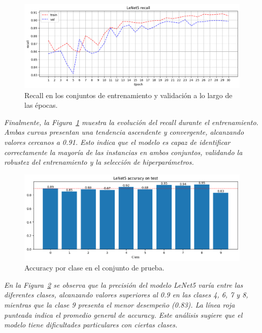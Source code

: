 \documentclass[conference]{IEEEtran}
\begin{document}
\begin{figure}[H]
    \centering
    \includegraphics[width=0.95\linewidth]{graphics-raw-da/raw-da-recall-train_val.png}
    \caption{Recall en los conjuntos de entrenamiento y validación a lo largo de las épocas.}
    \label{fig:raw-da-recall-train_val}
\end{figure}
\noindent\textit{
Finalmente, la Figura~\ref{fig:raw-da-recall-train_val} muestra la evolución del recall durante el entrenamiento. Ambas curvas presentan una tendencia ascendente y convergente, alcanzando valores cercanos a 0.91. Esto indica que el modelo es capaz de identificar correctamente la mayoría de las instancias en ambos conjuntos, validando la robustez del entrenamiento y la selección de hiperparámetros.
}


\begin{figure}[H]
    \centering
    \includegraphics[width=0.95\linewidth]{graphics-raw-da/raw-da-accuracy-test.png}
    \caption{Accuracy por clase en el conjunto de prueba.}
    \label{fig:raw-da-accuracy-test}
\end{figure}
\noindent\textit{
En la Figura~\ref{fig:raw-da-accuracy-test} se observa que la precisión del modelo LeNet5 varía entre las diferentes clases, alcanzando valores superiores al 0.9 en las clases 4, 6, 7 y 8, mientras que la clase 9 presenta el menor desempeño (0.83). La línea roja punteada indica el promedio general de accuracy. Este análisis sugiere que el modelo tiene dificultades particulares con ciertas clases.
}
\end{document}
